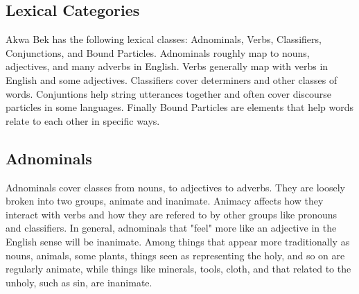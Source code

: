 \documentclass[11pt,letterpaper]{article}
\begin{document}
  \subsection{Lexical Categories}
  \label{categories}
  Akwa Bek has the following lexical classes: Adnominals, Verbs, Classifiers, Conjunctions, and Bound Particles. Adnominals roughly map to nouns, adjectives, and many adverbs in English. Verbs generally map with verbs in English and some adjectives. Classifiers cover determiners and other classes of words. Conjuntions help string utterances together and often cover discourse particles in some languages. Finally Bound Particles are elements that help words relate to each other in specific ways.

  \subsection{Adnominals}
  \label{adnominals}
  Adnominals cover classes from nouns, to adjectives to adverbs. They are loosely broken into two groups, animate and inanimate. Animacy affects how they interact with verbs and how they are refered to by other groups like pronouns and classifiers. In general, adnominals that "feel" more like an adjective in the English sense will be inanimate. Among things that appear more traditionally as nouns, animals, some plants, things seen as representing the holy, and so on are regularly animate, while things like minerals, tools, cloth, and that related to the unholy, such as sin, are inanimate.
\end{document}
